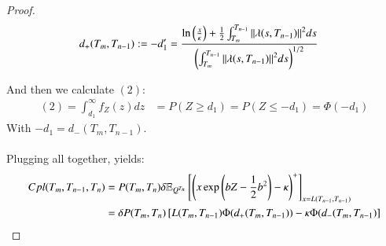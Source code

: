 \begin{proof}
\begin{align*}
d_{+}(T_{m}, T_{n-1}) &:= -d_{1}' = 
\frac{
\ln\left(\frac{x}{\kappa}\right) + \frac{1}{2}\int_{T_{m}}^{T_{n-1}}\norm{\lambda(s,T_{n-1})}^{2}ds
}{
\left(
\int_{T_{m}}^{T_{n-1}}\norm{\lambda(s,T_{n-1})}^{2}ds
\right)^{1/2}
}
\end{align*}

And then we calculate $(2)$:
\begin{align*}
(2) = 
\int_{d_{1}}^{\infty}f_{Z}(z)dz &= P(Z\geq d_{1}) = P(Z \leq -d_{1}) = \Phi(-d_{1})    
\end{align*}
With $-d_{1} = d_{-}(T_{m}, T_{n-1})$. 
\\~\\ 
Plugging all together, yields: 
\begin{align*}
Cpl(T_{m}, T_{n-1}, T_{n}) &= 
P(T_{m}, T_{n})\delta
\mathbb{E}_{Q^{T_{n}}}\left[
\left(x\exp\left(bZ-\frac{1}{2}b^{2}\right) - \kappa
\right)^{+}
\right]_{x = L(T_{n-1}, T_{n-1})} \\ 
&= 
\delta P(T_{m}, T_{n})\left[
L(T_{m}, T_{n-1})\Phi(d_{+}(T_{m}, T_{n-1}))
-\kappa \Phi(d_{-}(T_{m}, T_{n-1})
\right]
\end{align*}

\end{proof}
